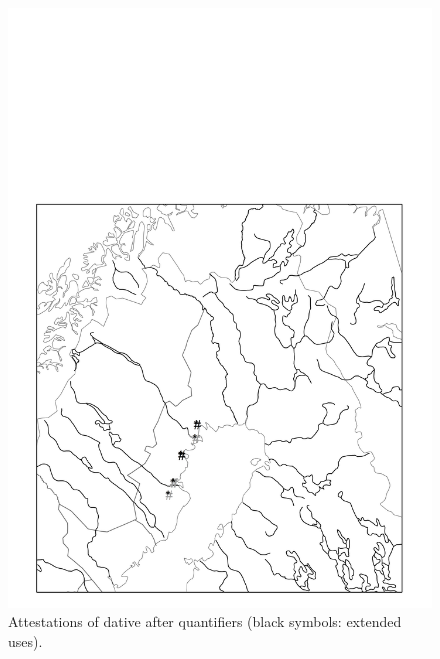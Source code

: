 \begin{figure}[h]
\includegraphics[height=.3\textheight]{figures/18_AttestationsofDatives}
\caption{Attestations of dative after quantifiers (black symbols: extended uses).}
\label{map:14}

\end{figure}

